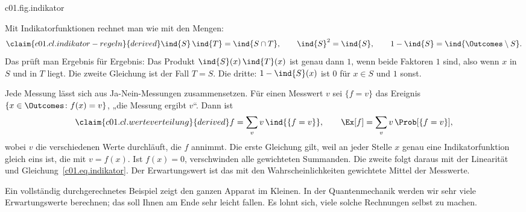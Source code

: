 \begin{tpcfigure}{c01.fig.indikator}

  \caption{Eine Ja-Nein-Messung am gezinkten Würfel aus Gleichung~\eqref{c01.eq.gezinkt}.
    (a) Die Indikatorfunktion des Ereignisses $S = \{2,4,6\}$, gestrichelt wie alle
    Messungen. (b) Die Gewichte $\pw(x)$ (Umrisse) und die Produkte $\pw(x)\,\ind{S}(x)$
    (schraffiert): Die Indikatorfunktion lässt nur die Balken über $S$ übrig. Ihre Höhen
    ergeben zusammen $\Ex[\ind{S}] = \Prob[S] = \tfrac{7}{12}$.}
\end{tpcfigure}

Mit Indikatorfunktionen rechnet man wie mit den Mengen:
\begin{equation}\label{c01.eq.indikator-regeln}\claim{c01.cl.indikator-regeln}{derived}
  \ind{S}\,\ind{T} = \ind{S \cap T},
  \qquad
  \ind{S}^2 = \ind{S},
  \qquad
  1 - \ind{S} = \ind{\Outcomes \setminus S} .
\end{equation}
Das prüft man Ergebnis für Ergebnis: Das Produkt $\ind{S}(x)\,\ind{T}(x)$ ist genau dann
$1$, wenn beide Faktoren $1$ sind, also wenn $x$ in $S$ und in $T$ liegt. Die zweite
Gleichung ist der Fall $T = S$. Die dritte: $1 - \ind{S}(x)$ ist $0$ für $x \in S$ und $1$
sonst.

Jede Messung lässt sich aus Ja-Nein-Messungen zusammensetzen. Für einen Messwert $v$ sei
$\{f = v\}$ das Ereignis $\{x \in \Outcomes \colon f(x) = v\}$, „die Messung ergibt $v$“.
Dann ist
\begin{equation}\label{c01.eq.werteverteilung}\claim{c01.cl.werteverteilung}{derived}
  f = \sum_{v} v\, \ind{\{f = v\}},
  \qquad
  \Ex[f] = \sum_{v} v\, \Prob[\{f = v\}] ,
\end{equation}
wobei $v$ die verschiedenen Werte durchläuft, die $f$ annimmt. Die erste Gleichung gilt,
weil an jeder Stelle $x$ genau eine Indikatorfunktion gleich eins ist, die mit
$v = f(x)$. Ist $f(x) = 0$, verschwinden alle gewichteten Summanden. Die zweite folgt daraus mit der Linearität und Gleichung~\eqref{c01.eq.indikator}. Der
Erwartungswert ist das mit den Wahrscheinlichkeiten gewichtete Mittel der Messwerte.

Ein vollständig durchgerechnetes Beispiel zeigt den ganzen Apparat im Kleinen. In der
Quantenmechanik werden wir sehr viele Erwartungswerte berechnen; das soll Ihnen am Ende sehr
leicht fallen. Es lohnt sich, viele solche Rechnungen selbst zu machen.

